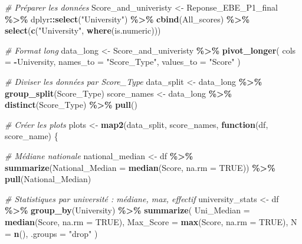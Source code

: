 \documentclass[
]{article}
\newenvironment{Shaded}{\begin{snugshade}}{\end{snugshade}}
\newcommand{\AttributeTok}[1]{\textcolor[rgb]{0.13,0.29,0.53}{#1}}
\newcommand{\CommentTok}[1]{\textcolor[rgb]{0.56,0.35,0.01}{\textit{#1}}}
\newcommand{\ConstantTok}[1]{\textcolor[rgb]{0.56,0.35,0.01}{#1}}
\newcommand{\ControlFlowTok}[1]{\textcolor[rgb]{0.13,0.29,0.53}{\textbf{#1}}}
\newcommand{\FunctionTok}[1]{\textcolor[rgb]{0.13,0.29,0.53}{\textbf{#1}}}
\newcommand{\NormalTok}[1]{#1}
\newcommand{\OtherTok}[1]{\textcolor[rgb]{0.56,0.35,0.01}{#1}}
\newcommand{\SpecialCharTok}[1]{\textcolor[rgb]{0.81,0.36,0.00}{\textbf{#1}}}
\newcommand{\StringTok}[1]{\textcolor[rgb]{0.31,0.60,0.02}{#1}}
\begin{document}
\begin{Shaded}
\begin{Highlighting}[]
\CommentTok{\# Préparer les données}
\NormalTok{Score\_and\_univeristy }\OtherTok{\textless{}{-}}\NormalTok{ Reponse\_EBE\_P1\_final }\SpecialCharTok{\%\textgreater{}\%}
\NormalTok{  dplyr}\SpecialCharTok{::}\FunctionTok{select}\NormalTok{(}\StringTok{"University"}\NormalTok{) }\SpecialCharTok{\%\textgreater{}\%}
  \FunctionTok{cbind}\NormalTok{(All\_scores) }\SpecialCharTok{\%\textgreater{}\%}
  \FunctionTok{select}\NormalTok{(}\FunctionTok{c}\NormalTok{(}\StringTok{"University"}\NormalTok{, }\FunctionTok{where}\NormalTok{(is.numeric)))}

\CommentTok{\# Format long}
\NormalTok{data\_long }\OtherTok{\textless{}{-}}\NormalTok{ Score\_and\_univeristy }\SpecialCharTok{\%\textgreater{}\%}
  \FunctionTok{pivot\_longer}\NormalTok{(}
    \AttributeTok{cols =} \SpecialCharTok{{-}}\NormalTok{University,}
    \AttributeTok{names\_to =} \StringTok{"Score\_Type"}\NormalTok{,}
    \AttributeTok{values\_to =} \StringTok{"Score"}
\NormalTok{  )}

\CommentTok{\# Diviser les données par Score\_Type}
\NormalTok{data\_split }\OtherTok{\textless{}{-}}\NormalTok{ data\_long }\SpecialCharTok{\%\textgreater{}\%} \FunctionTok{group\_split}\NormalTok{(Score\_Type)}
\NormalTok{score\_names }\OtherTok{\textless{}{-}}\NormalTok{ data\_long }\SpecialCharTok{\%\textgreater{}\%} \FunctionTok{distinct}\NormalTok{(Score\_Type) }\SpecialCharTok{\%\textgreater{}\%} \FunctionTok{pull}\NormalTok{()}

\CommentTok{\# Créer les plots}
\NormalTok{plots }\OtherTok{\textless{}{-}} \FunctionTok{map2}\NormalTok{(data\_split, score\_names, }\ControlFlowTok{function}\NormalTok{(df, score\_name) \{}
  
  \CommentTok{\# Médiane nationale}
\NormalTok{  national\_median }\OtherTok{\textless{}{-}}\NormalTok{ df }\SpecialCharTok{\%\textgreater{}\%}
    \FunctionTok{summarize}\NormalTok{(}\AttributeTok{National\_Median =} \FunctionTok{median}\NormalTok{(Score, }\AttributeTok{na.rm =} \ConstantTok{TRUE}\NormalTok{)) }\SpecialCharTok{\%\textgreater{}\%}
    \FunctionTok{pull}\NormalTok{(National\_Median)}
  
  \CommentTok{\# Statistiques par université : médiane, max, effectif}
\NormalTok{  university\_stats }\OtherTok{\textless{}{-}}\NormalTok{ df }\SpecialCharTok{\%\textgreater{}\%}
    \FunctionTok{group\_by}\NormalTok{(University) }\SpecialCharTok{\%\textgreater{}\%}
    \FunctionTok{summarize}\NormalTok{(}
      \AttributeTok{Uni\_Median =} \FunctionTok{median}\NormalTok{(Score, }\AttributeTok{na.rm =} \ConstantTok{TRUE}\NormalTok{),}
      \AttributeTok{Max\_Score =} \FunctionTok{max}\NormalTok{(Score, }\AttributeTok{na.rm =} \ConstantTok{TRUE}\NormalTok{),}
      \AttributeTok{N =} \FunctionTok{n}\NormalTok{(),}
      \AttributeTok{.groups =} \StringTok{"drop"}
\NormalTok{    )}
  

\end{Highlighting}
\end{Shaded}
\end{document}

